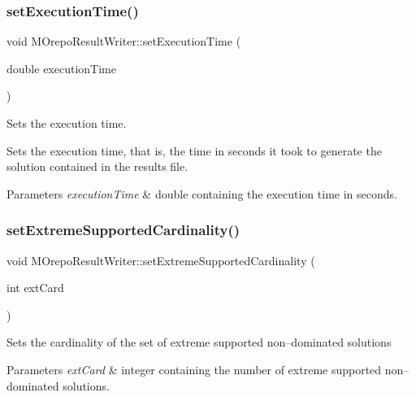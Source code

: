 \subsubsection{\texorpdfstring{set\+Execution\+Time()}{setExecutionTime()}}
{\footnotesize\ttfamily void M\+Orepo\+Result\+Writer\+::set\+Execution\+Time (\begin{DoxyParamCaption}\item[{double}]{execution\+Time }\end{DoxyParamCaption})\hspace{0.3cm}{\ttfamily [inline]}}



Sets the execution time. 

Sets the execution time, that is, the time in seconds it took to generate the solution contained in the results file. 
\begin{DoxyParams}{Parameters}
{\em execution\+Time} & double containing the execution time in seconds. \\
\hline
\end{DoxyParams}
\mbox{\label{class_m_orepo_result_writer_a5d8fb239afcead1e6eb3fef1b0313ca0}} 
\subsubsection{\texorpdfstring{set\+Extreme\+Supported\+Cardinality()}{setExtremeSupportedCardinality()}}
{\footnotesize\ttfamily void M\+Orepo\+Result\+Writer\+::set\+Extreme\+Supported\+Cardinality (\begin{DoxyParamCaption}\item[{int}]{ext\+Card }\end{DoxyParamCaption})\hspace{0.3cm}{\ttfamily [inline]}}

Sets the cardinality of the set of extreme supported non--dominated solutions 
\begin{DoxyParams}{Parameters}
{\em ext\+Card} & integer containing the number of extreme supported non--dominated solutions. \\
\hline
\end{DoxyParams}
\mbox{\label{class_m_orepo_result_writer_ac7d7814f7bb9716a46101e22fc38c1da}} 
